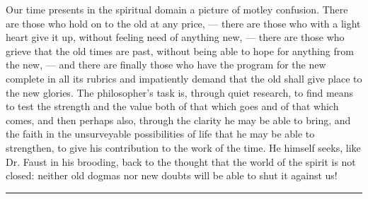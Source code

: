 \documentclass[12pt,a4paper,openany]{book}
\newcommand{\opage}[1]{\marginnote{\footnotesize\textit{[#1]}}}
\newcommand{\streg}{\begin{center}\rule{3em}{0.4pt}\end{center}}
\begin{document}
Our time presents in the spiritual domain a picture
of motley confusion. There are those who hold on to the
old at any price, --- there are those who with a light heart
give it up, without feeling need of anything new, ---
there are those who grieve that the old times are past,
without being able to hope for anything from the new, --- and there are
finally those who have the program for the new complete in all
its rubrics and impatiently demand that the old shall give
place to the new glories. The philosopher's task is,
through quiet research, to find means to test the strength
\opage{243}and the value both of that which goes and of that which comes,
and then perhaps also, through the clarity he may be able to
bring, and the faith in the unsurveyable possibilities of life that he
may be able to strengthen, to give his contribution to the work of the time.
He himself seeks, like Dr. Faust in his brooding, back
to the thought that the world of the spirit is not closed: neither
old dogmas nor new doubts will be able to shut it
against us!

\streg{}
\end{document}
